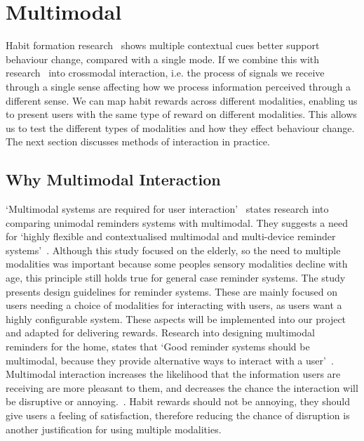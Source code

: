 
\newpage

\section{Multimodal}
Habit formation research~\cite{article_understanding_use_contextual_cues_design_impl} shows multiple contextual cues better support behaviour change, compared with a single mode. If we combine this with research~\cite{article_natural_cross_modal_mappings} into crossmodal interaction, i.e. the process of signals we receive through a single sense affecting how we process information perceived through a different sense. We can map habit rewards across different modalities, enabling us to present users with the same type of reward on different modalities. This allows us to test the different types of modalities and how they effect behaviour change. The next section discusses methods of interaction in practice.

\subsection{Why Multimodal Interaction}
`Multimodal systems are required for user interaction'~\cite{article_user_centred_multimodal_reminders} states research into comparing unimodal reminders systems with multimodal. They suggests a need for `highly flexible and contextualised multimodal and multi-device reminder systems'~\cite{article_user_centred_multimodal_reminders}. Although this study focused on the elderly, so the need to multiple modalities was important because some peoples sensory modalities decline with age, this principle still holds true for general case reminder systems. The study presents design guidelines for reminder systems. These are mainly focused on users needing a choice of modalities for interacting with users, as users want a highly configurable system. These aspects will be implemented into our project and adapted for delivering rewards.\newline
\newline
Research into designing multimodal reminders for the home, states that `Good reminder systems should be multimodal, because they provide alternative ways to interact with a user'~\cite{article_designing_multimodal_reminders_for_home}. Multimodal interaction increases the likelihood that the information users are receiving are more pleasant to them, and decreases the chance the interaction will be disruptive or annoying.~\cite{article_designing_multimodal_reminders_for_home}. Habit rewards should not be annoying, they should give users a feeling of satisfaction, therefore reducing the chance of disruption is another justification for using multiple modalities.

